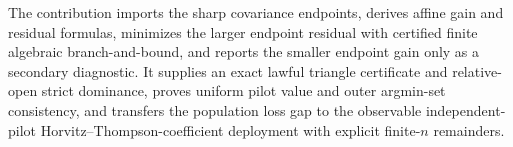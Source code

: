 The contribution imports the sharp covariance endpoints, derives affine gain and residual formulas, minimizes the larger endpoint residual with certified finite algebraic branch-and-bound, and reports the smaller endpoint gain only as a secondary diagnostic.  It supplies an exact lawful triangle certificate and relative-open strict dominance, proves uniform pilot value and outer argmin-set consistency, and transfers the population loss gap to the observable independent-pilot Horvitz--Thompson-coefficient deployment with explicit finite-\(n\) remainders.